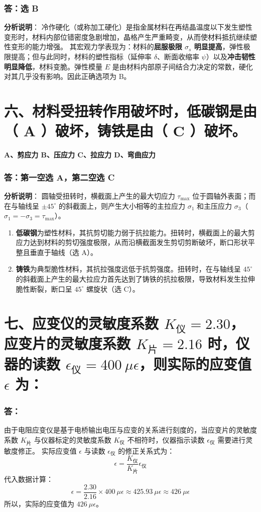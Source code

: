 \documentclass[11pt,a4paper]{ctexrep}
\begin{document}
{\subsubsection*{答：选 B}
\textbf{分析说明}：
冷作硬化（或称加工硬化）是指金属材料在再结晶温度以下发生塑性变形时，材料内部位错密度急剧增加，晶格产生严重畸变，从而使材料抵抗继续塑性变形的能力增强。
其宏观力学表现为：材料的\textbf{屈服极限 $\sigma_s$ 明显提高}，弹性极限提高；但与此同时，材料的塑性指标（延伸率 $\delta$、断面收缩率 $\psi$）以及\textbf{冲击韧性明显降低}，材料变脆。弹性模量 $E$ 是由材料内部原子间结合力决定的常数，硬化对其几乎没有影响。因此正确选项为 B。

\section*{六、材料受扭转作用破坏时，低碳钢是由（ A ）破坏，铸铁是由（ C ）破坏。}
\textbf{A、剪应力 \qquad B、压应力 \qquad C、拉应力 \qquad D、弯曲应力}

\subsubsection*{答：第一空选 A，第二空选 C}
\textbf{分析说明}：
圆轴受扭转时，横截面上产生的最大切应力 $\tau_{\max}$ 位于圆轴外表面；而在与轴线呈 $\pm 45^\circ$ 的斜截面上，则产生大小相等的主拉应力 $\sigma_1$ 和主压应力 $\sigma_3$（$\sigma_1 = -\sigma_3 = \tau_{\max}$）。
\begin{enumerate}
    \item \textbf{低碳钢}为塑性材料，其抗剪切能力弱于抗拉能力。扭转时，横截面上的最大剪应力达到材料的剪切强度极限，从而沿横截面发生剪切剪断破坏，断口形状平整且垂直于轴线（选 A）。
    \item \textbf{铸铁}为典型脆性材料，其抗拉强度远低于抗剪强度。扭转时，在与轴线呈 $45^\circ$ 的斜截面上产生的最大拉应力首先达到了铸铁的抗拉极限，导致材料发生拉伸脆性断裂，断口呈 $45^\circ$ 螺旋状（选 C）。
\end{enumerate}

\section*{七、应变仪的灵敏度系数 $K_{\text{仪}} = 2.30$，应变片的灵敏度系数 $K_{\text{片}} = 2.16$ 时，仪器的读数 $\epsilon_{\text{仪}} = 400\ \mu\epsilon$，则实际的应变值 $\epsilon$ 为：}

\subsubsection*{答：}
由于电阻应变仪是基于电桥输出电压与应变的关系进行刻度的，当应变片的灵敏度系数 $K_{\text{片}}$ 与仪器标定的灵敏度系数 $K_{\text{仪}}$ 不相符时，仪器指示读数 $\epsilon_{\text{仪}}$ 需要进行灵敏度修正。
实际应变值 $\epsilon$ 与读数 $\epsilon_{\text{仪}}$ 的修正关系式为：
\[
    \epsilon = \frac{K_{\text{仪}}}{K_{\text{片}}} \epsilon_{\text{仪}}
\]
代入数据计算：
\[
    \epsilon = \frac{2.30}{2.16} \times 400\ \mu\epsilon \approx 425.93\ \mu\epsilon \approx 426\ \mu\epsilon
\]
所以，实际的应变值为 \textbf{$426\ \mu\epsilon$}。


}
\end{document}
